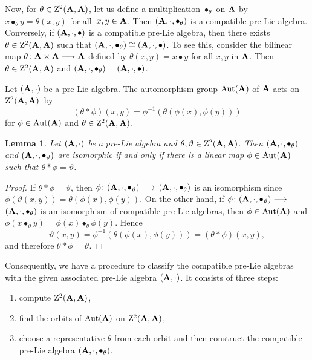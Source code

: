 \documentclass[pdftex]{sigma}
\numberwithin{equation}{section}
\newtheorem{Lemma}[Theorem]{Lemma}
\begin{document}
Now, for $\theta \in {\rm Z}^{2}( {\bf A},{\bf A})$, let us define a multiplication
$\bullet_{\theta }$ on ${\bf A}$ by $x\bullet_{\theta}y=\theta ( x,y) $ for all~${x,y \in {\bf A}}$.
Then $( {\bf A},\cdot ,\bullet_{\theta }) $ is a compatible pre-Lie
algebra.
Conversely, if $( {\bf A},\cdot ,\bullet ) $ is a compatible pre-Lie algebra,
then there exists $\theta \in {\rm Z}^{2}(
{\bf A},{\bf A}) $ such that $(
{\bf A},\cdot ,\bullet_{\theta }) \cong( {\bf A},\cdot ,\bullet
)$. To see this, consider the bilinear map $\theta \colon{\bf A}\times {\bf A}\longrightarrow {\bf A}$ defined by $
\theta ( x,y) = x\bullet y$ for all $x,y$ in ${\bf A}$. Then $\theta \in {\rm Z}^{2}(
{\bf A},{\bf A}) $ and $(
{\bf A},\cdot ,\bullet_\theta ) =( {\bf A},\cdot ,\bullet
)$.



Let $( {\bf A},\cdot ) $ be a pre-Lie
algebra. The automorphism group ${\rm Aut}( {\bf A}) $
of ${\bf A}$ acts on ${\rm Z}^{2}( {\bf A},{\bf A}) $~by
\[
(\theta *\phi) ( x,y) =\phi ^{-1}( \theta ( \phi (
x) ,\phi ( y) ) )
\]
for $\phi \in {\rm Aut}
( {\bf A}) $ and $\theta \in {\rm Z}^{2}( {\bf A}, {\bf A}) $.

\begin{Lemma}
\label{isom}Let $( {\bf A},\cdot ) $ be a pre-Lie algebra
and $\theta ,\vartheta \in {\rm Z}^{2}( {\bf A},{\bf A}) $.
Then $( {\bf A},\cdot ,\bullet_{\theta }) $ and $%
( {\bf A},\cdot ,\bullet_{\vartheta }) $ are
isomorphic if and only if there is a linear map $\phi \in {\rm Aut}( {\bf A}
)$ such that $\theta *\phi =\vartheta $.
\end{Lemma}

\begin{proof}
If $\theta * \phi =\vartheta $, then $\phi \colon( {\bf A},\cdot ,\bullet_{\vartheta }) \longrightarrow $ $( {\bf A},\cdot
,\bullet_{\theta }) $ is an isomorphism since
$\phi
( \vartheta ( x,y) ) =\theta ( \phi (
x) ,\phi ( y) ) $. On the other hand, if $\phi
\colon( {\bf A},\cdot ,\bullet_{\vartheta })
\longrightarrow $ $( {\bf A},\cdot ,\bullet _{\theta
}) $ is an isomorphism of compatible pre-Lie algebras, then $\phi \in {\rm Aut}%
( {\bf A}) $ and $\phi ( x\bullet _{\vartheta
}y ) = \phi ( x) \bullet _{\theta } \phi ( y)
 $. Hence
 \[
 \vartheta ( x,y) =\phi ^{-1}( \theta
( \phi ( x) ,\phi ( y) ) ) =(\theta *
\phi )( x,y),
 \]
 and therefore $\theta * \phi=\vartheta $.
\end{proof}


Consequently, we have a procedure to classify the compatible pre-Lie algebras with the given
associated pre-Lie algebra $( {\bf A},\cdot )
$. It consists of three steps:
\begin{enumerate}\itemsep=0pt
\item[(1)] compute ${\rm Z}^{2}( {\bf A},{\bf A}) $,
\item[(2)] find the orbits of ${\rm Aut}( {\bf A}) $ on $%
{\rm Z}^{2}( {\bf A},{\bf A}) $,
\item[(3)] choose a representative $\theta$ from each orbit and then construct the compatible pre-Lie algebra $( {\bf A},\cdot,\bullet _{\theta }) $.
\end{enumerate}
\end{document}
